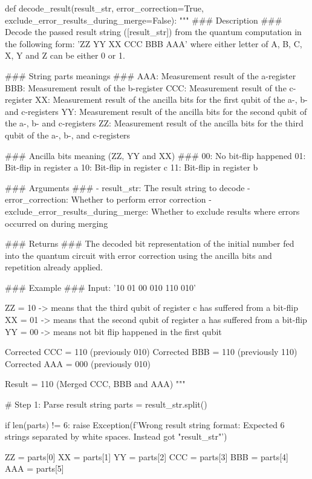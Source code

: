 \begin{python}
def decode_result(result_str, error_correction=True, exclude_error_results_during_merge=False):
    """
    ### Description ###
    Decode the passed result string ([result_str]) from the quantum computation in the following form:
    'ZZ YY XX CCC BBB AAA' where either letter of A, B, C, X, Y and Z can be either 0 or 1.

    ### String parts meanings ###
    AAA: Measurement result of the a-register
    BBB: Measurement result of the b-register
    CCC: Measurement result of the c-register
    XX: Measurement result of the ancilla bits for the first qubit of the a-, b- and c-registers
    YY: Measurement result of the ancilla bits for the second qubit of the a-, b- and c-registers
    ZZ: Measurement result of the ancilla bits for the third qubit of the a-, b-, and c-registers

    ### Ancilla bits meaning (ZZ, YY and XX) ###
    00: No bit-flip happened
    01: Bit-flip in register a
    10: Bit-flip in register c
    11: Bit-flip in register b

    ### Arguments ###
    - result_str: The result string to decode
    - error_correction: Whether to perform error correction
    - exclude_error_results_during_merge: Whether to exclude results where errors occurred on during merging

    ### Returns ###
    The decoded bit representation of the initial number fed into the quantum circuit
    with error correction using the ancilla bits and repetition already applied.

    ### Example ###
    Input: '10 01 00 010 110 010'

    ZZ = 10 -> means that the third qubit of register c has suffered from a bit-flip
    XX = 01 -> means that the second qubit of register a has suffered from a bit-flip
    YY = 00 -> means not bit flip happened in the first qubit

    Corrected CCC = 110 (previously 010)
    Corrected BBB = 110 (previously 110)
    Corrected AAA = 000 (previously 010)

    Result = 110 (Merged CCC, BBB and AAA)
    """

    # Step 1: Parse result string
    parts = result_str.split()

    if len(parts) != 6:
        raise Exception(f'Wrong result string format: Expected 6 strings separated by white spaces. Instead got "{result_str}"')

    ZZ = parts[0]
    XX = parts[1]
    YY = parts[2]
    CCC = parts[3]
    BBB = parts[4]
    AAA = parts[5]


\end{python}
